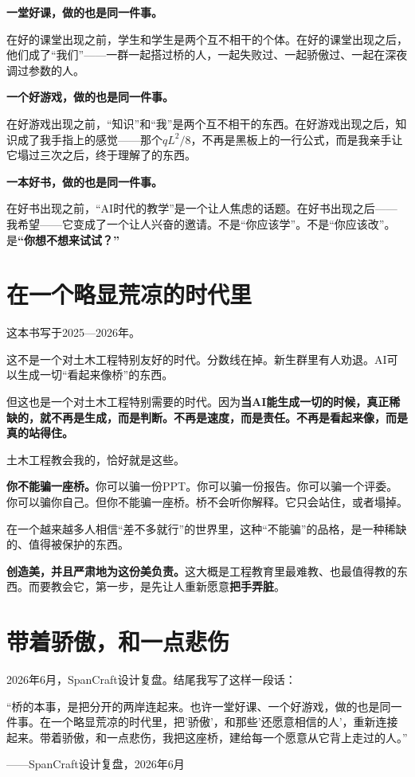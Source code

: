 \textbf{一堂好课，做的也是同一件事。}

在好的课堂出现之前，学生和学生是两个互不相干的个体。在好的课堂出现之后，他们成了``我们''——一群一起搭过桥的人，一起失败过、一起骄傲过、一起在深夜调过参数的人。

\textbf{一个好游戏，做的也是同一件事。}

在好游戏出现之前，``知识''和``我''是两个互不相干的东西。在好游戏出现之后，知识成了我手指上的感觉——那个$qL^2/8$，不再是黑板上的一行公式，而是我亲手让它塌过三次之后，终于理解了的东西。

\textbf{一本好书，做的也是同一件事。}

在好书出现之前，``AI时代的教学''是一个让人焦虑的话题。在好书出现之后——我希望——它变成了一个让人兴奋的邀请。不是``你应该学''。不是``你应该改''。是\textbf{``你想不想来试试？''}

\section{在一个略显荒凉的时代里}

这本书写于2025—2026年。

这不是一个对土木工程特别友好的时代。分数线在掉。新生群里有人劝退。AI可以生成一切``看起来像桥''的东西。

但这也是一个对土木工程特别需要的时代。因为\textbf{当AI能生成一切的时候，真正稀缺的，就不再是生成，而是判断。不再是速度，而是责任。不再是看起来像，而是真的站得住。}

土木工程教会我的，恰好就是这些。

\textbf{你不能骗一座桥。}你可以骗一份PPT。你可以骗一份报告。你可以骗一个评委。你可以骗你自己。但你不能骗一座桥。桥不会听你解释。它只会站住，或者塌掉。

在一个越来越多人相信``差不多就行''的世界里，这种``不能骗''的品格，是一种稀缺的、值得被保护的东西。

\textbf{创造美，并且严肃地为这份美负责。}这大概是工程教育里最难教、也最值得教的东西。而要教会它，第一步，是先让人重新愿意\textbf{把手弄脏}。

\section{带着骄傲，和一点悲伤}

2026年6月，SpanCraft设计复盘。结尾我写了这样一段话：

\begin{shiyu-inline}
``桥的本事，是把分开的两岸连起来。也许一堂好课、一个好游戏，做的也是同一件事。在一个略显荒凉的时代里，把'骄傲'，和那些'还愿意相信的人'，重新连接起来。带着骄傲，和一点悲伤，我把这座桥，建给每一个愿意从它背上走过的人。''

\hfill ——SpanCraft设计复盘，2026年6月
\end{shiyu-inline}

